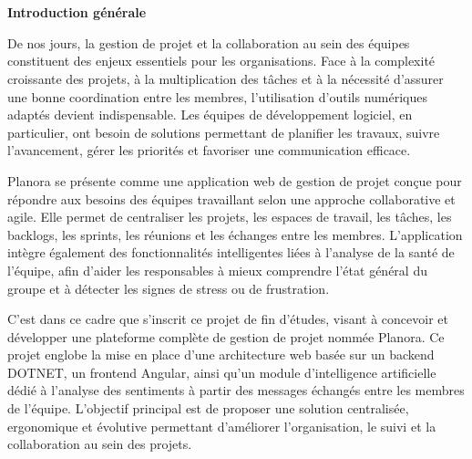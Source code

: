 \chapter*{}
\vspace{-3em}
{\raggedleft\huge\bfseries Introduction générale\par}
\vspace{2em}
\label{chap:intro}

De nos jours, la gestion de projet et la collaboration au sein des équipes constituent des enjeux essentiels pour les organisations. Face à la complexité croissante des projets, à la multiplication des tâches et à la nécessité d'assurer une bonne coordination entre les membres, l'utilisation d'outils numériques adaptés devient indispensable. Les équipes de développement logiciel, en particulier, ont besoin de solutions permettant de planifier les travaux, suivre l'avancement, gérer les priorités et favoriser une communication efficace.

Planora se présente comme une application web de gestion de projet conçue pour répondre aux besoins des équipes travaillant selon une approche collaborative et agile. Elle permet de centraliser les projets, les espaces de travail, les tâches, les backlogs, les sprints, les réunions et les échanges entre les membres. L'application intègre également des fonctionnalités intelligentes liées à l'analyse de la santé de l'équipe, afin d'aider les responsables à mieux comprendre l'état général du groupe et à détecter les signes de stress ou de frustration.

C'est dans ce cadre que s'inscrit ce projet de fin d'études, visant à concevoir et développer une plateforme complète de gestion de projet nommée Planora. Ce projet englobe la mise en place d'une architecture web basée sur un backend \ac{DOTNET}, un frontend Angular, ainsi qu'un module d'intelligence artificielle dédié à l'analyse des sentiments à partir des messages échangés entre les membres de l'équipe. L'objectif principal est de proposer une solution centralisée, ergonomique et évolutive permettant d'améliorer l'organisation, le suivi et la collaboration au sein des projets.

